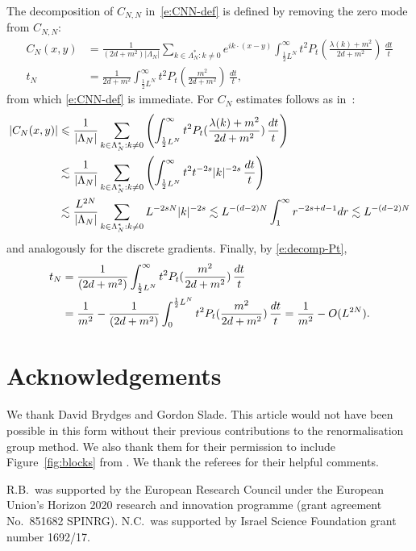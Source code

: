 \documentclass[11pt]{amsart}
\numberwithin{equation}{section}
\numberwithin{theorem}{section}
\newcommand{\1}{{\bf 1}}
\begin{document}
The decomposition of $C_{N,N}$ in~\eqref{e:CNN-def} is defined by removing
the zero mode from $C_{N,N}$:
\begin{align}
  C_{N}(x,y) &= \frac{1}{(2d+m^2)|\Lambda_N|}\sum_{k \in \Lambda_N^*:k \neq 0} e^{ik\cdot(x-y)} \int_{\frac12 L^N}^\infty t^2 P_t(\frac{\lambda(k)+m^2}{2d+m^2}) \, \frac{dt}{t}
  \\
  t_N &= \frac{1}{2d+m^2} \int_{\frac12 L^N}^\infty t^2 P_t(\frac{m^2}{2d+m^2}) \, \frac{dt}{t},
\end{align}
from which \eqref{e:CNN-def} is immediate.
For $C_{N}$ estimates follows as in~\cite[Chapter~3]{MR3969983}:
\begin{align}
  |C_N(x,y)| &\leqslant \frac{1}{|\Lambda_N|} \sum_{k \in \Lambda_N^*: k \neq 0} \left({\int_{\frac12 L^N}^\infty t^2 P_t(\frac{\lambda(k)+m^2}{2d+m^2}) \, \frac{dt}{t}}\right)
    \nonumber\\
  &\lesssim \frac{1}{|\Lambda_N|} \sum_{k \in \Lambda_N^*: k \neq 0} \left({\int_{\frac12 L^N}^\infty t^{2}t^{-2s}|k|^{-2s} \, \frac{dt}{t}}\right) 
  \nonumber\\
  &\lesssim
    \frac{L^{2N}}{|\Lambda_N|} \sum_{k \in \Lambda_N^*: k \neq 0}L^{-2sN}|k|^{-2s}
    \lesssim L^{-(d-2)N} \int_1^\infty r^{-2s+d-1} dr \lesssim L^{-(d-2)N}
\end{align}
and analogously for the discrete gradients.
Finally, by \eqref{e:decomp-Pt}, 
\begin{align}
  t_N
  &= \frac{1}{(2d+m^2)} \int_{\frac12 L^N}^\infty t^2P_t(\frac{m^2}{2d+m^2}) \, \frac{dt}{t}
    \nonumber\\
  &= \frac{1}{m^2}-
    \frac{1}{(2d+m^2)} \int_0^{\frac12 L^N} t^2P_t(\frac{m^2}{2d+m^2}) \, \frac{dt}{t}
      =\frac{1}{m^2} - O(L^{2N}).
\end{align}






\section*{Acknowledgements}

We thank David Brydges and Gordon Slade. This article would not have been possible in this form without their previous contributions
to the renormalisation group method.
We also thank them for their permission to include
Figure~\ref{fig:blocks} from \cite{MR3969983}. We thank the referees for their helpful comments.

R.B.\ was supported by the European Research Council under the European Union's Horizon 2020 research and innovation programme
(grant agreement No.~851682 SPINRG).
N.C.\ was supported by Israel Science Foundation grant number 1692/17.



\end{document}
